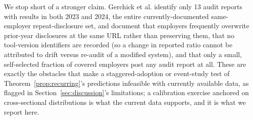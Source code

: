 We stop short of a stronger claim. Gerchick et al. identify only 13 audit reports with results in both 2023 and 2024, the entire currently-documented same-employer repeat-disclosure set, and document that employers frequently overwrite prior-year disclosures at the same URL rather than preserving them, that no tool-version identifiers are recorded (so a change in reported ratio cannot be attributed to drift versus re-audit of a modified system), and that only a small, self-selected fraction of covered employers post any audit report at all. These are exactly the obstacles that make a staggered-adoption or event-study test of Theorem~\ref{prop:recurring}'s predictions infeasible with currently available data, as flagged in Section~\ref{sec:discussion}'s limitations; a calibration exercise anchored on cross-sectional distributions is what the current data supports, and it is what we report here.
